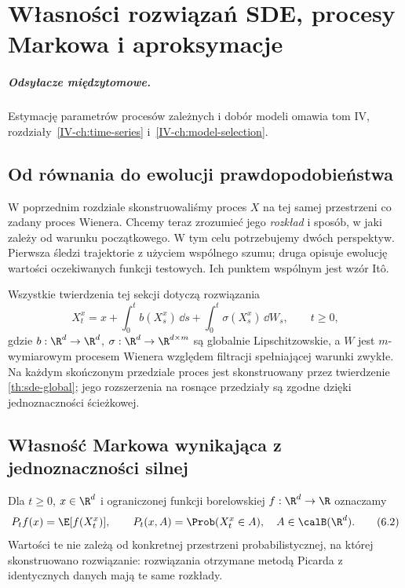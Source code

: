 \chapter{Własności rozwiązań SDE, procesy Markowa i aproksymacje}
\label{ch:sde-properties}
\paragraph{Odsyłacze międzytomowe.} Estymację parametrów procesów zależnych i dobór modeli omawia tom IV, rozdziały~\ref{IV-ch:time-series} i~\ref{IV-ch:model-selection}.


\section{Od równania do ewolucji prawdopodobieństwa}
W poprzednim rozdziale skonstruowaliśmy proces $X$ na tej
samej przestrzeni co zadany proces Wienera. Chcemy teraz
zrozumieć jego \emph{rozkład} i sposób, w jaki zależy od
warunku początkowego. W tym celu potrzebujemy dwóch
perspektyw. Pierwsza śledzi trajektorie z użyciem wspólnego
szumu; druga opisuje ewolucję wartości oczekiwanych
funkcji testowych. Ich punktem wspólnym jest wzór Itô.

Wszystkie twierdzenia tej sekcji dotyczą rozwiązania
\[
X_t^x=x+\int_0^t b(X_s^x)\,\dd s
+\int_0^t\sigma(X_s^x)\,\dd W_s,\qquad t\ge0,
\tag{6.1}\label{eq:timehom-sde}
\]
gdzie $b:\R^d\to\R^d$, $\sigma:\R^d\to\R^{d\times m}$
są globalnie Lipschitzowskie, a $W$ jest $m$-wymiarowym
procesem Wienera względem filtracji spełniającej warunki
zwykłe. Na każdym skończonym przedziale proces jest
skonstruowany przez twierdzenie \ref{th:sde-global};
jego rozszerzenia na rosnące przedziały są zgodne
dzięki jednoznaczności ścieżkowej.

\section{Własność Markowa wynikająca z jednoznaczności silnej}
\begin{definicja}
Dla $t\ge0$, $x\in\R^d$ i ograniczonej funkcji
borelowskiej $f:\R^d\to\R$ oznaczamy
\[
P_tf(x)=\E[f(X_t^x)],\qquad
P_t(x,A)=\Prob(X_t^x\in A),\quad A\in\calB(\R^d).
\tag{6.2}\label{eq:sde-semigroup}
\]
Wartości te nie zależą od konkretnej przestrzeni
probabilistycznej, na której skonstruowano rozwiązanie:
rozwiązania otrzymane metodą Picarda z identycznych
danych mają te same rozkłady.
\end{definicja}

